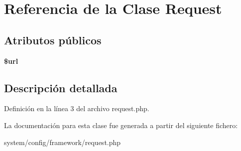 \hypertarget{class_request}{}\section{Referencia de la Clase Request}
\label{class_request}
\subsection*{Atributos públicos}
\begin{DoxyCompactItemize}
\item 
\mbox{\label{class_request_a2f93bd61bb0609304eeba0dfa68d1708}} 
{\bfseries \$url}
\end{DoxyCompactItemize}


\subsection{Descripción detallada}


Definición en la línea 3 del archivo request.\+php.



La documentación para esta clase fue generada a partir del siguiente fichero\+:\begin{DoxyCompactItemize}
\item 
system/config/framework/request.\+php\end{DoxyCompactItemize}
